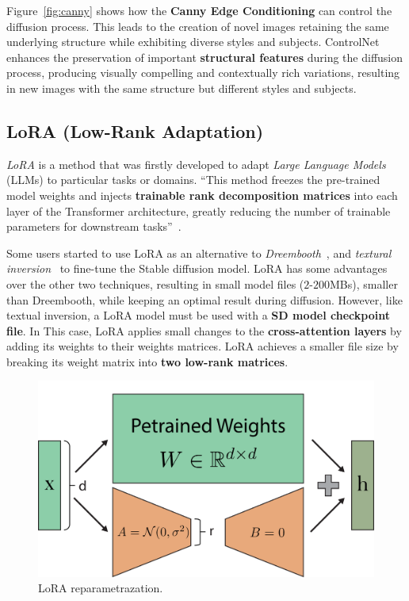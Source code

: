 \documentclass[preprint]{elsarticle}
\begin{document}
Figure~\ref{fig:canny} shows how the \textbf{Canny Edge Conditioning} can control the diffusion process.
This leads to the creation of novel images retaining the same underlying structure while exhibiting diverse styles and subjects.
ControlNet enhances the preservation of important \textbf{structural features} during the diffusion process, producing visually compelling and contextually rich variations, resulting in new images with the same structure but different styles and subjects.



\subsection{LoRA (Low-Rank Adaptation)}\label{sect:lora}

\emph{LoRA} \cite{hu2021lora} is a method that was firstly developed to adapt 
\emph{Large Language Models} (LLMs) to particular tasks or domains.
``This method freezes  the pre-trained model weights and injects \textbf{trainable rank decomposition matrices}  into each layer of the Transformer architecture, greatly reducing the number of trainable 
parameters for downstream tasks''~\cite{hu2021lora}.

Some users started to use LoRA as an alternative to \emph{Dreembooth}~\cite{ruiz2022dreambooth}, and \emph{textural inversion}~\cite{gal2022image} to  fine-tune the Stable diffusion model. LoRA has some advantages over the other two techniques, resulting in small model files ($2$-$200$MBs), smaller than Dreembooth,  while keeping an optimal result during diffusion. However, like textual inversion, a LoRA model must be used with a \textbf{SD model checkpoint file}. In This case, LoRA applies small changes to the \textbf{cross-attention layers} by adding its  weights to their weights matrices. LoRA achieves a smaller file size by breaking its weight matrix into \textbf{two low-rank matrices}.


\begin{figure}[t]
	\centering
    \includegraphics[scale=0.62]{img/svg/LoRA.png}
	\caption{LoRA reparametrazation.}\label{fig:lora}
\end{figure}
\end{document}
